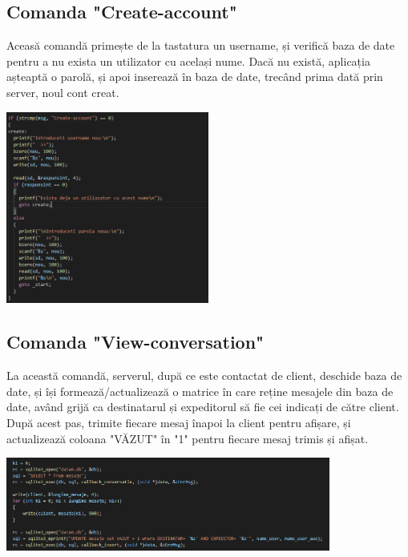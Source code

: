 \documentclass[a4paper,12pt]{article}
\begin{document}
\subsection{Comanda "Create-account"}

\tab
Aceasă comandă primește de la tastatura un username, și verifică baza de date pentru a nu exista un utilizator cu același nume. Dacă nu există, aplicația așteaptă o parolă, și apoi inserează în baza de date, trecând prima dată prin server, noul cont creat.

\bigskip

\begin{center}
\includegraphics[width=0.5\textwidth]{Create-account.png}
\end{center}

\subsection{Comanda "View-conversation"}

\tab
La această comandă, serverul, după ce este contactat de client, deschide baza de date, și își formează/actualizează o matrice în care reține mesajele din baza de date, având grijă ca destinatarul și expeditorul să fie cei indicați de către client. După acest pas, trimite fiecare mesaj înapoi la client pentru afișare, și actualizează coloana "VĂZUT" în "1" pentru fiecare mesaj trimis și afișat.

\bigskip

\begin{center}
\includegraphics[width=0.8\textwidth]{View-conversation.png}
\end{center}
\end{document}
